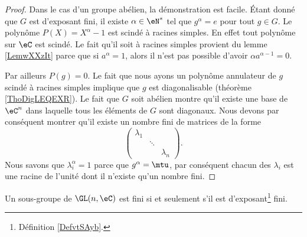 \begin{proof}
    Dans le cas d'un groupe abélien, la démonstration est facile. Étant donné que \( G\) est d'exposant fini, il existe \( \alpha\in \eN^*\) tel que \( g^{\alpha}=e\) pour tout \( g\in G\). Le polynôme \( P(X)=X^{\alpha}-1\) est scindé à racines simples. En effet tout polynôme sur \( \eC\) est scindé. Le fait qu'il soit à racines simples provient du lemme \ref{LemwXXzIt} parce que si \( a^{\alpha}=1\), alors il n'est pas possible d'avoir \( \alpha a^{\alpha-1}=0\).

    Par ailleurs \( P(g)=0\). Le fait que nous ayons un polynôme annulateur de \( g\) scindé à racines simples implique que \( g\) est diagonalisable (théorème \ref{ThoDigLEQEXR}). Le fait que \( G\) soit abélien montre qu'il existe une base de \( \eC^n\) dans laquelle tous les éléments de \( G\) sont diagonaux. Nous devons par conséquent montrer qu'il existe un nombre fini de matrices de la forme
    \begin{equation}
        \begin{pmatrix}
            \lambda_1    &       &       \\
                &   \ddots    &       \\
                &       &   \lambda_n
        \end{pmatrix}.
    \end{equation}
    Nous savons que \( \lambda_i^{\alpha}=1\) parce que \( g^{\alpha}=\mtu\), par conséquent chacun des \( \lambda_i\) est une racine de l'unité dont il n'existe qu'un nombre fini.
\end{proof}

\begin{theorem}\label{ThooJLTit}
    Un sous-groupe de \( \GL(n,\eC)\) est fini si et seulement s'il est d'exposant\footnote{Définition \ref{DefvtSAyb}.} fini.
\end{theorem}

